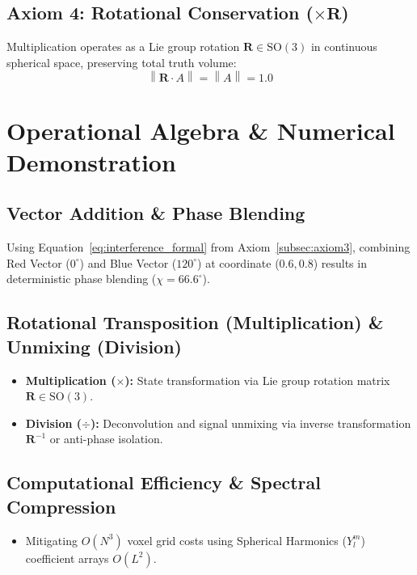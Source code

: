 \documentclass[12pt, a4paper]{article}
\providecommand{\norm}[1]{\left\lVert#1\right\rVert}
\begin{document}
\subsection{Axiom 4: Rotational Conservation (\texorpdfstring{$\times \mathbf{R}$}{x R})}
\label{subsec:axiom4}
Multiplication operates as a Lie group rotation $\mathbf{R} \in \mathrm{SO}(3)$ in continuous spherical space, preserving total truth volume:
\begin{equation}
    \norm{\mathbf{R} \cdot A} = \norm{A} = 1.0
\end{equation}

\section{Operational Algebra \& Numerical Demonstration}

\subsection{Vector Addition \& Phase Blending}
Using Equation~\eqref{eq:interference_formal} from Axiom~\ref{subsec:axiom3}, combining Red Vector ($0^\circ$) and Blue Vector ($120^\circ$) at coordinate ($0.6, 0.8$) results in deterministic phase blending ($\chi = 66.6^\circ$).

\subsection{Rotational Transposition (Multiplication) \& Unmixing (Division)}
\begin{itemize}
    \item \textbf{Multiplication ($\times$):} State transformation via Lie group rotation matrix $\mathbf{R} \in \mathrm{SO}(3)$.
    \item \textbf{Division ($\div$):} Deconvolution and signal unmixing via inverse transformation $\mathbf{R}^{-1}$ or anti-phase isolation.
\end{itemize}

\subsection{Computational Efficiency \& Spectral Compression}
\begin{itemize}
    \item Mitigating $O(N^3)$ voxel grid costs using Spherical Harmonics ($Y_l^m$) coefficient arrays $O(L^2)$.
\end{itemize}
\end{document}
